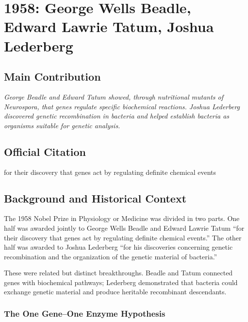 \chapter[1958 --- Beadle, Tatum, and Lederberg]{1958: George Wells Beadle, Edward Lawrie Tatum, Joshua Lederberg}
\label{ch:1958_Beadle}

\section*{Main Contribution}

\textit{George Beadle and Edward Tatum showed, through nutritional mutants of \textit{Neurospora}, that genes regulate specific biochemical reactions. Joshua Lederberg discovered genetic recombination in bacteria and helped establish bacteria as organisms suitable for genetic analysis.}\cite{nobel-1958,lecture-beadle-1958,lecture-tatum-1958,lecture-lederberg-1958}

\section{Official Citation}

for their discovery that genes act by regulating definite chemical events

\section{Background and Historical Context}

The 1958 Nobel Prize in Physiology or Medicine was divided in two parts. One half was awarded jointly to George Wells Beadle and Edward Lawrie Tatum ``for their discovery that genes act by regulating definite chemical events.'' The other half was awarded to Joshua Lederberg ``for his discoveries concerning genetic recombination and the organization of the genetic material of bacteria.''\cite{nobel-1958}

These were related but distinct breakthroughs. Beadle and Tatum connected genes with biochemical pathways; Lederberg demonstrated that bacteria could exchange genetic material and produce heritable recombinant descendants.

\subsection{The One Gene--One Enzyme Hypothesis}


